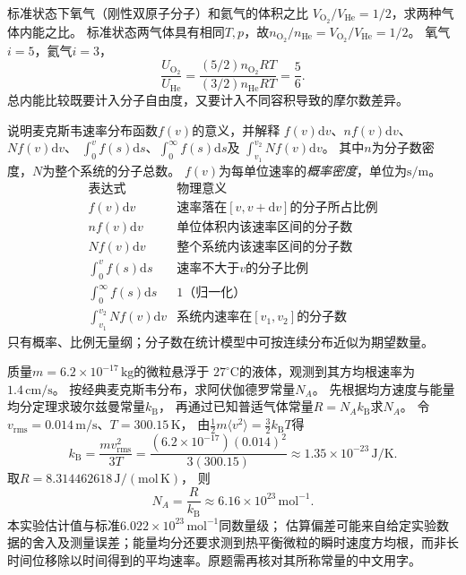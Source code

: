\problemtext 标准状态下氧气（刚性双原子分子）和氦气的体积之比
$V_{\mathrm{O_2}}/V_{\mathrm{He}}=1/2$，求两种气体内能之比。
\workings
标准状态两气体具有相同$T,p$，故$n_{\mathrm{O_2}}/n_{\mathrm{He}}
=V_{\mathrm{O_2}}/V_{\mathrm{He}}=1/2$。
氧气$i=5$，氦气$i=3$，
\[
\boxed{\frac{U_{\mathrm{O_2}}}{U_{\mathrm{He}}}
=\frac{(5/2)n_{\mathrm{O_2}}RT}
 {(3/2)n_{\mathrm{He}}RT}
=\frac{5}{6}}.
\]
\crosscheck 总内能比较既要计入分子自由度，又要计入不同容积导致的摩尔数差异。

\problemtext 说明麦克斯韦速率分布函数$f(v)$的意义，并解释
$f(v)\mathrm dv$、$nf(v)\mathrm dv$、$Nf(v)\mathrm dv$、
$\int_0^v f(s)\mathrm ds$、$\int_0^\infty f(s)\mathrm ds$及
$\int_{v_1}^{v_2}Nf(v)\mathrm dv$。
其中$n$为分子数密度，$N$为整个系统的分子总数。
\workings
$f(v)$为每单位速率的\emph{概率密度}，单位为$\mathrm{s/m}$。
\[
\begin{array}{l|l}
\text{表达式}&\text{物理意义}\\\hline
f(v)\mathrm dv&\text{速率落在}[v,v+\mathrm dv]\text{的分子所占比例}\\
nf(v)\mathrm dv&\text{单位体积内该速率区间的分子数}\\
Nf(v)\mathrm dv&\text{整个系统内该速率区间的分子数}\\
\int_0^v f(s)\mathrm ds&\text{速率不大于}v\text{的分子比例}\\
\int_0^\infty f(s)\mathrm ds&1\text{（归一化）}\\
\int_{v_1}^{v_2}Nf(v)\mathrm dv&
\text{系统内速率在}[v_1,v_2]\text{的分子数}
\end{array}
\]
\crosscheck 只有概率、比例无量纲；分子数在统计模型中可按连续分布近似为期望数量。

\problemtext 质量$m=6.2\times10^{-17}\,\mathrm{kg}$的微粒悬浮于
$27^\circ\mathrm C$的液体，观测到其方均根速率为$1.4\,\mathrm{cm/s}$。
按经典麦克斯韦分布，求阿伏伽德罗常量$N_A$。
\workings
先根据均方速度与能量均分定理求玻尔兹曼常量$k_{\mathrm B}$，
再通过已知普适气体常量$R=N_Ak_{\mathrm B}$求$N_A$。
令$v_{\mathrm{rms}}=0.014\,\mathrm{m/s}$、$T=300.15\,\mathrm K$，
由$\tfrac12m\langle v^2\rangle=\tfrac32k_{\mathrm B}T$得
\[
\boxed{k_{\mathrm B}=\frac{m v_{\mathrm{rms}}^2}{3T}
=\frac{(6.2\times10^{-17})(0.014)^2}{3(300.15)}
\approx1.35\times10^{-23}\,\mathrm{J/K}}.
\]
取$R=8.314462618\,\mathrm{J/(mol\,K)}$，
则
\[
\boxed{N_A=\frac{R}{k_{\mathrm B}}
\approx6.16\times10^{23}\,\mathrm{mol^{-1}}}.
\]
\crosscheck 本实验估计值与标准$6.022\times10^{23}\,\mathrm{mol^{-1}}$同数量级；
估算偏差可能来自给定实验数据的舍入及测量误差；能量均分还要求测到热平衡微粒的瞬时速度方均根，而非长时间位移除以时间得到的平均速率。原题需再核对其所称常量的中文用字。

